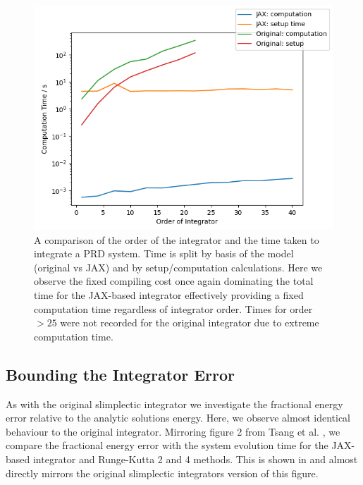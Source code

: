 \documentclass[10pt]{iopart}
\begin{document}
\begin{figure}
	\includegraphics[width=\columnwidth]{RPlot.jpg}
	\caption{A comparison of the order of the integrator and the time taken to integrate a PRD system. Time is split by basis of the model (original vs JAX) and by setup/computation calculations. Here we observe the fixed compiling cost once again dominating the total time for the JAX-based integrator effectively providing a fixed computation time regardless of integrator order. Times for order $>25$ were not recorded for the original integrator due to extreme computation time.}
		\label{rplot}
\end{figure}

\subsection{Bounding the Integrator Error}
As with the original slimplectic integrator we investigate the fractional energy error relative to the analytic solutions energy. Here, we observe almost identical behaviour to the original integrator. Mirroring figure 2 from Tsang et al. \cite{Tsang_Slimplectic}, we compare the fractional energy error with the system evolution time for the JAX-based integrator and Runge-Kutta 2 and 4 methods. This is shown in  and almost directly mirrors the original slimplectic integrators version of this figure. 
\end{document}

